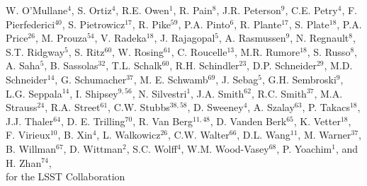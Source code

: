 {W. O'Mullane$^4$,
S. Ortiz$^4$,
R.E. Owen$^1$,
R. Pain$^{8}$,
J.R. Peterson$^{9}$,
C.E. Petry$^{4}$,
F. Pierfederici$^{40}$,
S. Pietrowicz$^{17}$,
R. Pike$^{59}$,
P.A. Pinto$^{6}$,
R. Plante$^{17}$,
S. Plate$^{18}$,
P.A. Price$^{26}$,
M. Prouza$^{54}$,
V. Radeka$^{18}$,
J. Rajagopal$^5$,
A. Rasmussen$^9$,
N. Regnault$^8$,
S.T. Ridgway$^5$,
S. Ritz$^{60}$,
W. Rosing$^{61}$,
C. Roucelle$^{13}$, 
M.R. Rumore$^{18}$, 
S. Russo$^8$,  
A. Saha$^{5}$,     
B. Sassolas$^{32}$, 
T.L. Schalk$^{60}$,     
R.H. Schindler$^{23}$,
D.P. Schneider$^{29}$, 
M.D. Schneider$^{14}$,
G. Schumacher$^{37}$,
M. E. Schwamb$^{69}$,
J. Sebag$^5$,
G.H. Sembroski$^9$,
L.G. Seppala$^{14}$,
I. Shipsey$^{9,56}$,
N. Silvestri$^1$,
J.A. Smith$^{62}$,
R.C. Smith$^{37}$,
M.A. Strauss$^{24}$,
R.A. Street$^{61}$,
C.W. Stubbs$^{38,58}$,
D. Sweeney$^4$,
A. Szalay$^{63}$,
P. Takacs$^{18}$,
J.J. Thaler$^{64}$,
D. E. Trilling$^{70}$,
R. Van Berg$^{11,48}$,
D. Vanden Berk$^{65}$,
K. Vetter$^{18}$,
F. Virieux$^{10}$,
B. Xin$^4$,
L. Walkowicz$^{26}$,
C.W. Walter$^{66}$,
D.L. Wang$^{11}$,
M. Warner$^{37}$,
B. Willman$^{67}$,
D. Wittman$^2$,
S.C. Wolff$^4$,
W.M. Wood-Vasey$^{68}$,
P. Yoachim$^1$,
and H. Zhan$^{74}$, \\
for the LSST Collaboration
}
\affil{}


